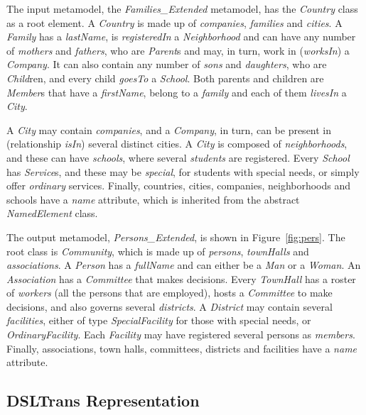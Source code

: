 The input metamodel, the \emph{Families\_Extended} metamodel, has the \emph{Country} class as a root element.
A \emph{Country} is made up of \emph{companies}, \emph{families} and \emph{cities}.
A \emph{Family} has a \emph{lastName}, is \emph{registeredIn} a \emph{Neighborhood} and can have any number of \emph{mothers} and \emph{fathers}, who are \emph{Parent}s and may, in turn, work in (\emph{worksIn}) a \emph{Company}.
It can also contain any number of \emph{sons} and \emph{daughters}, who are \emph{Child}ren, and every child \emph{goesTo} a \emph{School}.
Both parents and children are \emph{Member}s that have a \emph{firstName}, belong to a \emph{family} and each of them \emph{livesIn} a \emph{City}.

A \emph{City} may contain \emph{companies}, and a \emph{Company}, in turn, can be present in (relationship \emph{isIn}) several distinct cities.
A \emph{City} is composed of \emph{neighborhoods}, and these can have \emph{schools}, where several \emph{students} are registered.
Every \emph{School} has \emph{Service}s, and these may be \emph{special}, for students with special needs, or simply offer \emph{ordinary} services.
Finally, countries, cities, companies, neighborhoods and schools have a \emph{name} attribute, which is inherited from the abstract \emph{NamedElement} class.

The output metamodel, \emph{Persons\_Extended}, is shown in Figure~\ref{fig:pers}.
The root class is \emph{Community}, which is made up of \emph{persons}, \emph{townHalls} and \emph{associations}.
A \emph{Person} has a \emph{fullName} and can either be a \emph{Man} or a \emph{Woman}.
An \emph{Association} has a \emph{Committee} that makes decisions.
Every \emph{TownHall} has a roster of \emph{workers} (all the persons that are employed), hosts a \emph{Committee} to make decisions, and also governs several \emph{districts}.
A \emph{District} may contain several \emph{facilities}, either of type \emph{SpecialFacility} for those with special needs, or \emph{OrdinaryFacility}.
Each \emph{Facility} may have registered several persons as \emph{members}.
Finally, associations, town halls, committees, districts and facilities have a \emph{name} attribute.

\subsection{DSLTrans Representation}\label{sec:DSLTransRepresentation}

